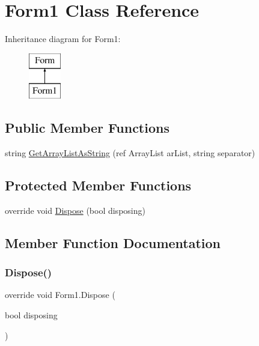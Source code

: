\hypertarget{class_form1}{}\section{Form1 Class Reference}
\label{class_form1}
Inheritance diagram for Form1\+:\begin{figure}[H]
\begin{center}
\leavevmode
\includegraphics[height=2.000000cm]{class_form1}
\end{center}
\end{figure}
\subsection*{Public Member Functions}
\begin{DoxyCompactItemize}
\item 
string \hyperlink{class_form1_a32e1fe98b622ea8a1a6f6e5a47b92c80}{Get\+Array\+List\+As\+String} (ref Array\+List ar\+List, string separator)
\end{DoxyCompactItemize}
\subsection*{Protected Member Functions}
\begin{DoxyCompactItemize}
\item 
override void \hyperlink{class_form1_a88d436b39d4189a8645e6ff6cbfdeb37}{Dispose} (bool disposing)
\end{DoxyCompactItemize}


\subsection{Member Function Documentation}
\mbox{\label{class_form1_a88d436b39d4189a8645e6ff6cbfdeb37}} 
\subsubsection{\texorpdfstring{Dispose()}{Dispose()}}
{\footnotesize\ttfamily override void Form1.\+Dispose (\begin{DoxyParamCaption}\item[{bool}]{disposing }\end{DoxyParamCaption})\hspace{0.3cm}{\ttfamily [protected]}}

